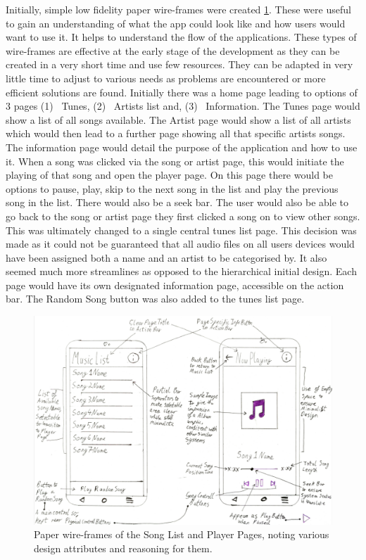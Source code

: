 \documentclass{l4proj}
\begin{document}
Initially, simple low fidelity paper wire-frames were created \ref{fig:paperWF}. These were useful to gain an understanding of what the app could look like and how users would want to use it. It helps to understand the flow of the applications. These types of wire-frames are effective at the early stage of the development as they can be created in a very short time and use few resources. They can be adapted in very little time to adjust to various needs as problems are encountered or more efficient solutions are found. Initially there was a home page leading to options of 3 pages (1)~ Tunes, (2)~ Artists list and, (3)~ Information. The Tunes page would show a list of all songs available. The Artist page would show a list of all artists which would then lead to a further page showing all that specific artists songs. The information page would detail the purpose of the application and how to use it. When a song was clicked via the song or artist page, this would initiate the playing of that song and open the player page. On this page there would be options to pause, play, skip to the next song in the list and play the previous song in the list. There would also be a seek bar. The user would also be able to go back to the song or artist page they first clicked a song on to view other songs. This was ultimately changed to a single central tunes list page. This decision was made as it could not be guaranteed that all audio files on all users devices would have been assigned both a name and an artist to be categorised by. It also seemed much more streamlines as opposed to the hierarchical initial design. Each page would have its own designated information page, accessible on the action bar. The Random Song button was also added to the tunes list page.

\begin{figure}[!htb]
    \centering
    \includegraphics[width=\textwidth,]{images/papWF.jpg}
        \caption{Paper wire-frames of the Song List and Player Pages, noting various design attributes and reasoning for them.}
        \label{fig:paperWF}
\end{figure}
\end{document}
